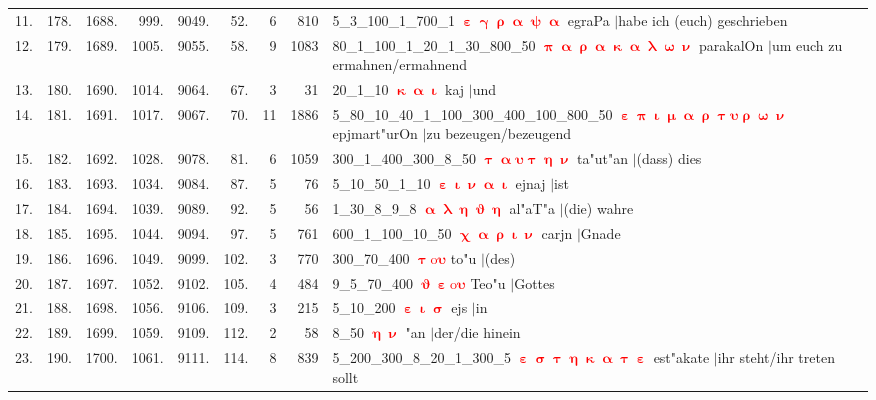 \documentclass[a4paper,10pt,landscape]{article}
\begin{document}
\begin{tabular}{rrrrrrrrp{120mm}}
11.&178.&1688.&999.&9049.&52.&6&810&5\_3\_100\_1\_700\_1 \textcolor{red}{$\boldsymbol{\upepsilon\upgamma\uprho\upalpha\uppsi\upalpha}$} egraPa $|$habe ich (euch) geschrieben\\
12.&179.&1689.&1005.&9055.&58.&9&1083&80\_1\_100\_1\_20\_1\_30\_800\_50 \textcolor{red}{$\boldsymbol{\uppi\upalpha\uprho\upalpha\upkappa\upalpha\uplambda\upomega\upnu}$} parakalOn $|$um euch zu ermahnen/ermahnend\\
13.&180.&1690.&1014.&9064.&67.&3&31&20\_1\_10 \textcolor{red}{$\boldsymbol{\upkappa\upalpha\upiota}$} kaj $|$und\\
14.&181.&1691.&1017.&9067.&70.&11&1886&5\_80\_10\_40\_1\_100\_300\_400\_100\_800\_50 \textcolor{red}{$\boldsymbol{\upepsilon\uppi\upiota\upmu\upalpha\uprho\uptau\upsilon\uprho\upomega\upnu}$} epjmart"urOn $|$zu bezeugen/bezeugend\\
15.&182.&1692.&1028.&9078.&81.&6&1059&300\_1\_400\_300\_8\_50 \textcolor{red}{$\boldsymbol{\uptau\upalpha\upsilon\uptau\upeta\upnu}$} ta"ut"an $|$(dass) dies\\
16.&183.&1693.&1034.&9084.&87.&5&76&5\_10\_50\_1\_10 \textcolor{red}{$\boldsymbol{\upepsilon\upiota\upnu\upalpha\upiota}$} ejnaj $|$ist\\
17.&184.&1694.&1039.&9089.&92.&5&56&1\_30\_8\_9\_8 \textcolor{red}{$\boldsymbol{\upalpha\uplambda\upeta\upvartheta\upeta}$} al"aT"a $|$(die) wahre\\
18.&185.&1695.&1044.&9094.&97.&5&761&600\_1\_100\_10\_50 \textcolor{red}{$\boldsymbol{\upchi\upalpha\uprho\upiota\upnu}$} carjn $|$Gnade\\
19.&186.&1696.&1049.&9099.&102.&3&770&300\_70\_400 \textcolor{red}{$\boldsymbol{\uptau\mathrm{o}\upsilon}$} to"u $|$(des)\\
20.&187.&1697.&1052.&9102.&105.&4&484&9\_5\_70\_400 \textcolor{red}{$\boldsymbol{\upvartheta\upepsilon\mathrm{o}\upsilon}$} Teo"u $|$Gottes\\
21.&188.&1698.&1056.&9106.&109.&3&215&5\_10\_200 \textcolor{red}{$\boldsymbol{\upepsilon\upiota\upsigma}$} ejs $|$in\\
22.&189.&1699.&1059.&9109.&112.&2&58&8\_50 \textcolor{red}{$\boldsymbol{\upeta\upnu}$} "an $|$der/die hinein\\
23.&190.&1700.&1061.&9111.&114.&8&839&5\_200\_300\_8\_20\_1\_300\_5 \textcolor{red}{$\boldsymbol{\upepsilon\upsigma\uptau\upeta\upkappa\upalpha\uptau\upepsilon}$} est"akate $|$ihr steht/ihr treten sollt\\
\end{tabular}\medskip \\
\end{document}
